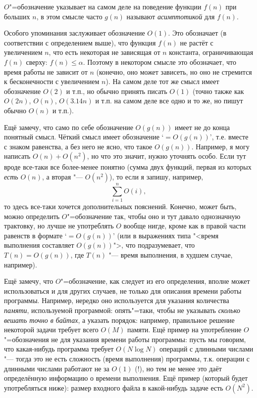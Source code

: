 \documentclass[a4paper,10pt]{problems}
\begin{document}
$O$"=обозначение указывает на самом деле на поведение функции $f(n)$ при больших $n$, в этом 
смысле часто $g(n)$ называют \textit{асимптотикой} для $f(n)$. 

Особого упоминания заслуживает обозначение $O(1)$. Это обозначает (в соответствии с 
определением выше), что функция $f(n)$ не растёт с увеличением $n$, что есть некоторая не 
зависящая от $n$ константа, ограничивающая $f(n)$ сверху: $f(n)\leq \alpha$. Поэтому 
в некотором смысле это обозначает, что время работы не зависит от $n$ (конечно, оно может 
зависеть, но оно не стремится к бесконечности с увеличением $n$). На самом деле тот же смысл 
имеет обозначение $O(2)$ и т.п., но обычно принять писать $O(1)$ (точно также как $O(2n)$, 
$O(n)$, $O(3.14n)$ и т.п. на самом деле все одно и то же, но пишут обычно $O(n)$ и т.п.).

Ещё замечу, что само по себе обозначение $O(g(n))$ имеет не до конца понятный смысл. Чёткий 
смысл имеет обозначение `$=O(g(n))$', т.е. вместе с знаком равенства, а без него не ясно, что 
такое $O(g(n))$. Например, я могу написать $O(n)+O(n^2)$, но что это значит, нужно уточнять 
особо. Если тут вроде все-таки все более-менее понятно (сумма двух функций, первая из которых 
\textit{есть} $O(n)$, а вторая "--- $O(n^2)$), то если я запишу, например,
$$
\sum_{i=1}^{n} O(i),
$$
то здесь все-таки хочется дополнительных пояснений. Конечно, может быть, можно определить 
$O$"=обозначение так, чтобы оно и тут давало однозначную трактовку, но лучше не употреблять $O$ 
вообще нигде, кроме как в правой части равенств в формате `$=O(g(n))$' (или в выражениях типа 
"<время выполнения составляет $O(g(n))$">, что подразумевает, что $T(n)=O(g(n))$, где $T(n)$ 
"--- время выполнения, в худшем случае, например).

Ещё замечу, что $O$"=обозначение, как следует из его определения, вполне может 
использоваться и для других случаев, не только для описания времени работы 
программы. Например, нередко оно используется для указания количества \textit{памяти}, 
используемой программой: опять"=таки, чтобы не указывать \textit{сколько вешать 
точно в байтах}, а указать порядок: например, правильное решение некоторой задачи 
требует всего $O(M)$ памяти. Ещё пример на употребление $O$"=обозначения не для указания времени работы программы: пусть мы говорим, что какая-нибудь программа требует $O(N\log N)$ 
операций с длинными числами "--- тогда это не есть сложность (время выполнения) 
программы, т.к. операции с длинными числами работают не за $O(1)$ (!), но тем не менее это даёт определённую информацию о времени выполнения. 
Ещё пример (который будет употребляться ниже): размер входного файла в 
какой-нибудь задаче есть $O(N^2)$.
\end{document}
